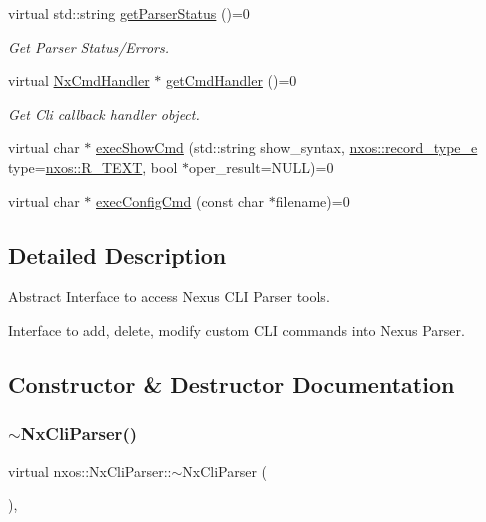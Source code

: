 \begin{DoxyCompactItemize}
virtual std\+::string \mbox{\hyperlink{classnxos_1_1_nx_cli_parser_a5a6839c678451ecbb78449df6960cf8c}{get\+Parser\+Status}} ()=0
\begin{DoxyCompactList}\small\item\em Get Parser Status/\+Errors. \end{DoxyCompactList}\item 
virtual \mbox{\hyperlink{classnxos_1_1_nx_cmd_handler}{Nx\+Cmd\+Handler}} $\ast$ \mbox{\hyperlink{classnxos_1_1_nx_cli_parser_af058955d7c6dae444a5dab084342d03c}{get\+Cmd\+Handler}} ()=0
\begin{DoxyCompactList}\small\item\em Get Cli callback handler object. \end{DoxyCompactList}\item 
virtual char $\ast$ \mbox{\hyperlink{classnxos_1_1_nx_cli_parser_a44b08502fa02c0f83b9dc26ef02e2be8}{exec\+Show\+Cmd}} (std\+::string show\+\_\+syntax, \mbox{\hyperlink{namespacenxos_a8952d5a318ed66cef9c7a83c7fd3ae91}{nxos\+::record\+\_\+type\+\_\+e}} type=\mbox{\hyperlink{namespacenxos_a8952d5a318ed66cef9c7a83c7fd3ae91a87ab8ea648d5e036e8748f8b2e48e76e}{nxos\+::\+R\+\_\+\+T\+E\+XT}}, bool $\ast$oper\+\_\+result=N\+U\+LL)=0
\item 
virtual char $\ast$ \mbox{\hyperlink{classnxos_1_1_nx_cli_parser_aa22ee0395ceadc46a3e28b93c5a5b75e}{exec\+Config\+Cmd}} (const char $\ast$filename)=0
\end{DoxyCompactItemize}


\subsection{Detailed Description}
Abstract Interface to access Nexus C\+LI Parser tools. 

Interface to add, delete, modify custom C\+LI commands into Nexus Parser. 

\subsection{Constructor \& Destructor Documentation}
\mbox{\label{classnxos_1_1_nx_cli_parser_ae7d5ada6ff25efd19ba95161fa60eeac}} 
\subsubsection{\texorpdfstring{$\sim$\+Nx\+Cli\+Parser()}{~NxCliParser()}}
{\footnotesize\ttfamily virtual nxos\+::\+Nx\+Cli\+Parser\+::$\sim$\+Nx\+Cli\+Parser (\begin{DoxyParamCaption}{ }\end{DoxyParamCaption})\hspace{0.3cm}{\ttfamily [inline]}, {\ttfamily [virtual]}}

